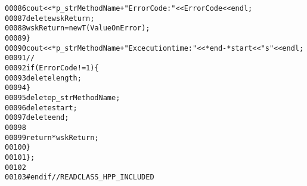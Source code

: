 \begin{footnotesize}
\begin{alltt}
00086                 cout<<*p\_strMethodName+\textcolor{stringliteral}{"ErrorCode: "}<<ErrorCode<<endl;
00087                 \textcolor{keyword}{delete} wskReturn;
00088                 wskReturn = \textcolor{keyword}{new} T (ValueOnError);
00089             \}
00090             cout<<*p\_strMethodName+\textcolor{stringliteral}{"Excecution time: "}<<*end-*start<<\textcolor{stringliteral}{"s"}<<endl;
00091             \textcolor{comment}{//}
00092             \textcolor{keywordflow}{if} ( ErrorCode != 1)\{
00093                 \textcolor{keyword}{delete} length;
00094             \}
00095             \textcolor{keyword}{delete} p\_strMethodName;
00096             \textcolor{keyword}{delete} start;
00097             \textcolor{keyword}{delete} end;
00098 
00099             \textcolor{keywordflow}{return} *wskReturn;
00100             \}
00101 \};
00102 
00103 \textcolor{preprocessor}{#endif // READCLASS\_HPP\_INCLUDED}
\end{alltt}\end{footnotesize}
